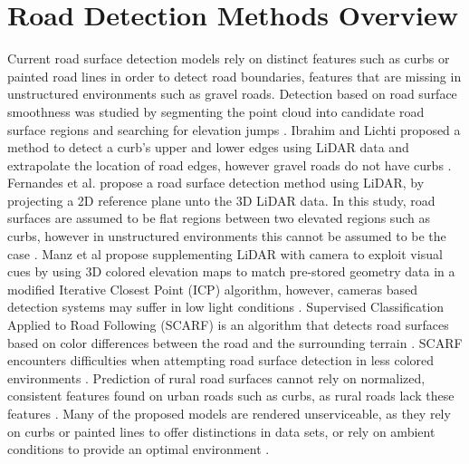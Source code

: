 \documentclass[numbered,pdftex]{ohio-etd}
\begin{document}
{	\section{Road Detection Methods Overview}{
		{Current road surface detection models rely on distinct features such as curbs or painted road lines in order to detect road boundaries, features that are missing in unstructured environments such as gravel roads. Detection based on road surface smoothness was studied by segmenting the point cloud into candidate road surface regions and searching for elevation jumps \cite{liu_new_2013}. Ibrahim and Lichti proposed a method to detect a curb's upper and lower edges using LiDAR data and extrapolate the location of road edges, however gravel roads do not have curbs \cite{ibrahim_curb-based_2012,skorseth_gravel_nodate}. Fernandes et al. propose a road surface detection method using LiDAR, by projecting a 2D reference plane unto the 3D LiDAR data. In this study, road surfaces are assumed to be flat regions between two elevated regions such as curbs, however in unstructured environments this cannot be assumed to be the case \cite{fernandes_road_2014}. Manz et al propose supplementing LiDAR with camera to exploit visual cues by using 3D colored elevation maps to match pre-stored geometry data in a modified Iterative Closest Point (ICP) algorithm, however, cameras based detection systems may suffer in low light conditions \cite{manz_detection_2011}. Supervised Classification Applied to Road Following (SCARF) is an algorithm that detects road surfaces based on color differences between the road and the surrounding terrain \cite{crisman_scarf_1993}. SCARF encounters difficulties when attempting road surface detection in less colored environments \cite{crisman_scarf_1993,manz_detection_2011}. Prediction of rural road surfaces cannot rely on normalized, consistent features found on urban roads such as curbs, as rural roads lack these features \cite{skorseth_gravel_nodate}. Many of the proposed models are rendered unserviceable, as they rely on curbs or painted lines to offer distinctions in data sets, or rely on ambient conditions to provide an optimal environment \cite{yadav_extraction_2017,liu_new_2013,qiu_fast_2016,fernandes_road_2014,seker_experiments_nodate,yang_semi-automated_2013,miyazaki_line-based_2014,hervieu_road_2013,smadja_road_nodate}.} 
		
}}
\end{document}
